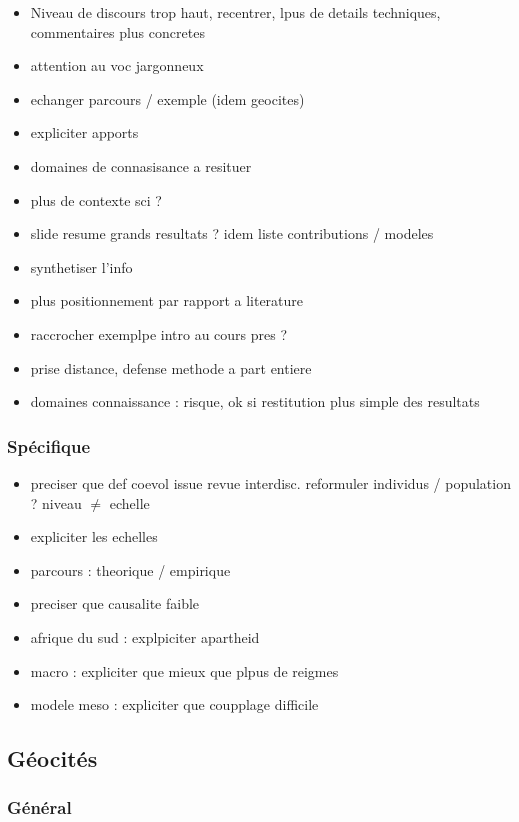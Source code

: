 \documentclass[11pt]{article}
\begin{document}
\begin{itemize}
	\item Niveau de discours trop haut, recentrer, lpus de details techniques, commentaires plus concretes
	\item attention au voc jargonneux
	\item echanger parcours / exemple (idem geocites)
	\item expliciter apports
	\item domaines de connasisance a resituer
	\item plus de contexte sci ?
	\item slide resume grands resultats ? idem liste contributions / modeles
	\item synthetiser l'info
	\item plus positionnement par rapport a literature
	\item raccrocher exemplpe intro au cours pres ?
	\item prise distance, defense methode a part entiere
	\item domaines connaissance : risque, ok si restitution plus simple des resultats
\end{itemize}


\subsubsection*{Spécifique}

\begin{itemize}
	\item preciser que def coevol issue revue interdisc. reformuler individus / population ? niveau $\neq$ echelle
	\item expliciter les echelles
	\item parcours : theorique / empirique
	\item preciser que causalite faible
	\item afrique du sud : explpiciter apartheid
	\item macro : expliciter que mieux que plpus de reigmes
	\item modele meso : expliciter que coupplage difficile
\end{itemize}



\subsection*{Géocités}

\subsubsection*{Général}
\end{document}
